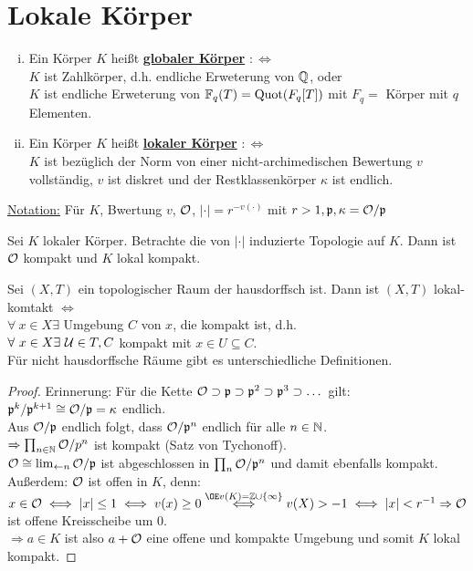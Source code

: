 \section{Lokale Körper}
\begin{defi}
\begin{enumerate}[i)]
\item Ein Körper $K$ heißt \textbf{\underline{globaler Körper}} $:\iff$\\
$K$ ist Zahlkörper, d.h. endliche Erweterung von $\mathbb{Q}$, oder\\
$K$ ist endliche Erweterung von $\mathbb{F}_q(T)=\operatorname{Quot}(F_q[T])$ mit $F_q=$ Körper mit $q$ Elementen.
\item Ein Körper $K$ heißt \textbf{\underline{lokaler Körper}} $: \iff$\\
$K$ ist bezüglich der Norm von einer nicht-archimedischen Bewertung $v$ vollständig, $v$ ist diskret und der Restklassenkörper $\kappa$ ist endlich.
\end{enumerate}
\underline{Notation:} Für $K$, Bwertung $v$, $\mathcal{O}$, $|\cdot|=r^{-v(\cdot)}$ mit $r >1, \mathfrak{p}, \kappa=\mathcal{O}/\mathfrak{p}$
\end{defi}

\begin{Prop}
Sei $K$ lokaler Körper. Betrachte die von $|\cdot|$ induzierte Topologie auf $K$. Dann ist $\mathcal{O}$ kompakt und $K$ lokal kompakt.
\end{Prop}

\begin{Err}
Sei $(X,T)$ ein topologischer Raum der hausdorffsch ist. Dann ist $(X,T)$ lokal-komtakt $\iff$\\
$\forall \ x \in X \exists$ Umgebung $C$ von $x$, die kompakt ist, d.h.\\
$\forall \ x \in X \exists \ \mathcal{U} \in T, C$ kompakt mit $x \in U \subseteq C$.\\
\danger Für nicht hausdorffsche Räume gibt es unterschiedliche Definitionen. %
\end{Err}

\begin{proof}
Erinnerung: Für die Kette $ \mathcal{O} \supset \mathfrak{p} \supset \mathfrak{p}^2 \supset \mathfrak{p}^3 \supset \dots$ gilt:\\
$\mathfrak{p}^k/\mathfrak{p}^{k+1} \cong \mathcal{O}/\mathfrak{p} = \kappa$ endlich.\\
Aus $\mathcal{O}/\mathfrak{p}$ endlich folgt, dass $\mathcal{O}/\mathfrak{p}^n$ endlich für alle $n \in \mathbb{N}$.\\
$\Rightarrow \prod_{n \in \mathbb{N}} \mathcal{O}/p^n$ ist kompakt (Satz von Tychonoff).\\
$\mathcal{O} \cong \lim_{\leftarrow n} \mathcal{O}/\mathfrak{p}$ ist abgeschlossen in $\prod_n \mathcal{O}/\mathfrak{p}^n$ und damit ebenfalls kompakt.\\
Außerdem: $\mathcal{O}$ ist offen in $K$, denn:\\
$x \in \O \iff |x| \leq 1 \iff v(x) \geq 0 \stackrel{\OE v(K)=\Z\cup \{\infty\}}{\iff} v(X) >-1 \iff |x|<r^{-1} \Rightarrow \O$ ist offene Kreisscheibe um 0.\\
$\Rightarrow a \in K$ ist also $a+\mathcal{O}$ eine offene und kompakte Umgebung und somit $K$ lokal kompakt.
\end{proof}